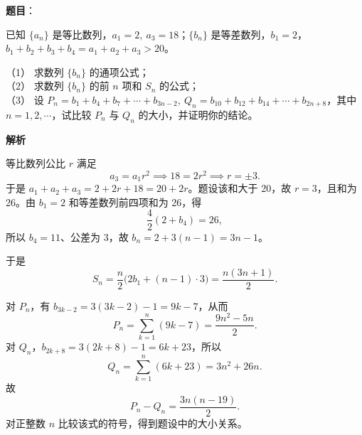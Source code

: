 \begin{answer}

\textbf{题目}：

已知 $\{a_n\}$ 是等比数列，$a_1=2,\ a_3=18$；$\{b_n\}$ 是等差数列，$b_1=2$，$b_1+b_2+b_3+b_4=a_1+a_2+a_3>20$。

（1） 求数列 $\{b_n\}$ 的通项公式；\\
（2） 求数列 $\{b_n\}$ 的前 $n$ 项和 $S_n$ 的公式；\\
（3） 设 $P_n=b_1+b_4+b_7+\cdots+b_{3n-2},\ Q_n=b_{10}+b_{12}+b_{14}+\cdots+b_{2n+8}$，其中 $n=1,2,\cdots$，试比较 $P_n$ 与 $Q_n$ 的大小，并证明你的结论。

\textbf{解析}


等比数列公比 $r$ 满足
\nopagebreak[4]
\[a_3=a_1r^2\implies 18=2r^2\implies r=\pm3.\]
于是 $a_1+a_2+a_3=2+2r+18=20+2r$。题设该和大于 20，故 $r=3$，且和为 26。由 $b_1=2$ 和等差数列前四项和为 26，得
\nopagebreak[4]
\[\frac42(2+b_4)=26,\]
所以 $b_4=11$、公差为 3，故 $b_n=2+3(n-1)=3n-1$。


于是
\nopagebreak[4]
\[S_n=\frac n2\bigl(2b_1+(n-1)\cdot3\bigr)=\frac{n(3n+1)}2.\]


对 $P_n$，有 $b_{3k-2}=3(3k-2)-1=9k-7$，从而
\nopagebreak[4]
\[P_n=\sum_{k=1}^n(9k-7)=\frac{9n^2-5n}{2}.\]
对 $Q_n$，$b_{2k+8}=3(2k+8)-1=6k+23$，所以
\nopagebreak[4]
\[Q_n=\sum_{k=1}^n(6k+23)=3n^2+26n.\]
故
\nopagebreak[4]
\[P_n-Q_n=\frac{3n(n-19)}2.\]
对正整数 $n$ 比较该式的符号，得到题设中的大小关系。




\end{answer}
